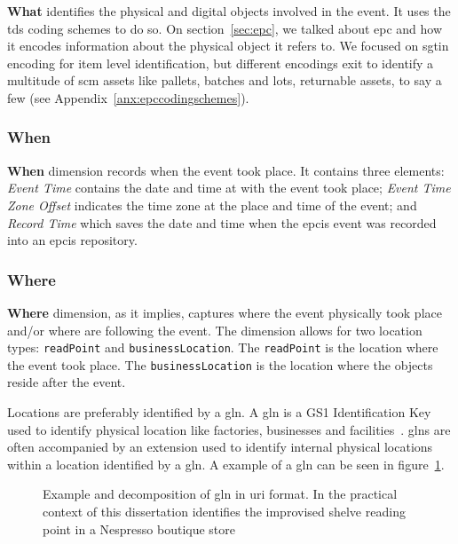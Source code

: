 \textbf{What} identifies the physical and digital objects involved in the event. It uses the \ac{tds} coding schemes to do so.  On section~\ref{sec:epc}, we talked about \ac{epc} and how it encodes information about the physical object it refers to. We focused on \ac{sgtin} encoding for item level identification, but different encodings exit to identify a multitude of \ac{scm} assets like pallets, batches and lots, returnable assets, to say a few (see Appendix~\ref{anx:epccodingschemes}).

\subsubsection{When}

\textbf{When} dimension records when the event took place. It contains three elements: \emph{Event Time} contains the date and time at with the event took place; \emph{Event Time Zone Offset} indicates the time zone at the place and time of the event; and \emph{Record Time} which saves the date and time when the \ac{epcis} event was recorded into an \ac{epcis} repository.

\subsubsection{Where}

\textbf{Where} dimension, as it implies, captures where the event physically took place and/or where are following the event. The dimension allows for two location types: \texttt{readPoint} and \texttt{businessLocation}.
The \texttt{readPoint} is the location where the event took place. The \texttt{businessLocation} is the location where the objects reside after the event.

Locations are preferably identified by a \ac{gln}. A \ac{gln} is a GS1 Identification Key used to identify physical location like factories, businesses and facilities~\cite{GS1KeysImplementation}. \acp{gln} are often accompanied by an extension used to identify internal physical locations within a location identified by a \ac{gln}. A example of a \ac{gln} can be seen in figure~\ref{fig:gln}. 

\begin{figure}[]
    \centering
    \caption{Example and decomposition of \ac{gln} in \ac{uri} format. In the practical context of this dissertation identifies the improvised shelve reading point in a Nespresso boutique store} 
    \label{fig:gln}
\end{figure}

